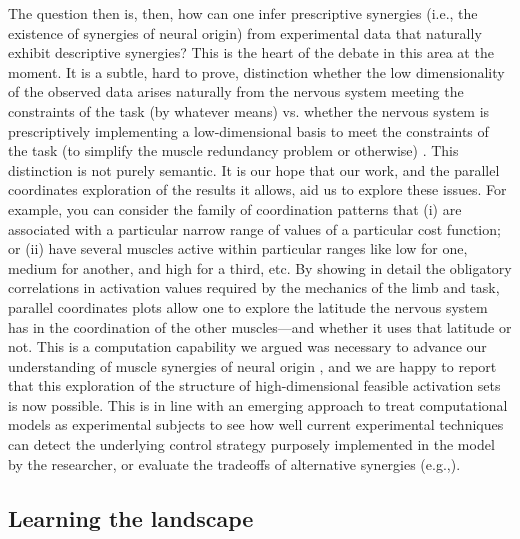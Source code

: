 The question then is, then, how can one infer prescriptive synergies (i.e., the existence of synergies of neural origin) from experimental data that naturally exhibit descriptive synergies? This is the heart of the debate in this area at the moment. It is  a subtle, hard to prove, distinction whether the low dimensionality of the observed data arises naturally  from the nervous system meeting the constraints of the task (by whatever means) vs. whether the nervous system is prescriptively implementing a low-dimensional basis to meet the constraints of the task (to simplify the muscle redundancy problem or otherwise) \cite{tresch2009case,kutch2012challenges,deRugy2013aremusclesynergiesuseful}.  This distinction is not purely semantic. It is our hope that our work, and the parallel coordinates exploration of the results it allows, aid us to explore these issues. For example, you can consider  the family of coordination patterns that  (i) are associated with a particular narrow range of values of a particular cost function; or (ii) have several muscles active within  particular ranges like low for one, medium for  another, and high for a third, etc. By showing in detail the obligatory correlations in activation values required by the mechanics of the limb and task,  parallel coordinates plots allow one to explore the latitude the nervous system has in the coordination of the other muscles---and whether it uses that latitude or not.  This is a computation capability we argued was necessary to advance our understanding of muscle synergies of neural origin \cite{kutch2012challenges}, and we are happy to report that this exploration of the structure of high-dimensional feasible activation sets is now possible. This is in line with an emerging  approach to treat computational models as experimental subjects to see how well current experimental techniques can detect the underlying  control strategy purposely implemented in the model by the researcher, or evaluate the tradeoffs of alternative synergies (e.g.,\cite{kutch2012challenges,alessandro2013musclesynergies,burkholder2013practical,moghadam2013well,steele2015consequences,ting1999phase}). 


\subsection*{Learning the landscape}

